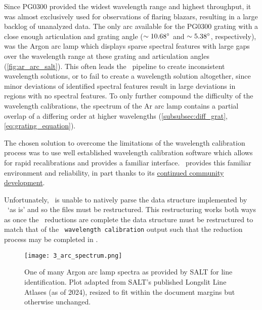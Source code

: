 Since PG$0300$ provided the widest wavelength range and highest throughput, it was almost exclusively used for observations of flaring blazars, resulting in a large backlog of unanalyzed data. The only arc available for the PG$0300$ grating with a close enough articulation and grating angle ($\sim 10.68\hbox{$^\circ$}$ and $\sim 5.38\hbox{$^\circ$}$, respectively), was the Argon arc lamp which displays sparse spectral features with large gaps over the wavelength range at these grating and articulation angles (\autoref{fig:ar_arc_salt}). This often leads the \polsalt\ pipeline to create inconsistent wavelength solutions, or to fail to create a wavelength solution altogether, since minor deviations of identified spectral features result in large deviations in regions with no spectral features. To only further compound the difficulty of the wavelength calibrations, the spectrum of the Ar arc lamp contains a partial overlap of a differing order at higher wavelengths (\autoref{subsubsec:diff_grat}, \autoref{eq:grating_equation}).

The chosen solution to overcome the limitations of the wavelength calibration process was to use well established wavelength calibration software which allows for rapid recalibrations and provides a familiar interface. \iraf\ provides this familiar environment and reliability, in part thanks to its \href{https://github.com/iraf-community/iraf}{continued community development}.

Unfortunately, \iraf\ is unable to natively parse the data structure implemented by \polsalt\ `as is' and so the files must be restructured. This restructuring works both ways as once the \iraf\ reductions are complete the data structure must be restructured to match that of the \polsalt\ \texttt{wavelength calibration} output such that the reduction process may be completed in \polsalt.

\begin{figure}[t]
    \centering
    \texttt{[image: 3\_arc\_spectrum.png]}
    \caption{One of many Argon arc lamp spectra as provided by \gls{SALT} for line identification. Plot adapted from \gls{SALT}'s published Longslit Line Atlases (as of 2024), resized to fit within the document margins but otherwise unchanged.\protect\footnotemark}
    \label{fig:ar_arc_salt}
\end{figure}

